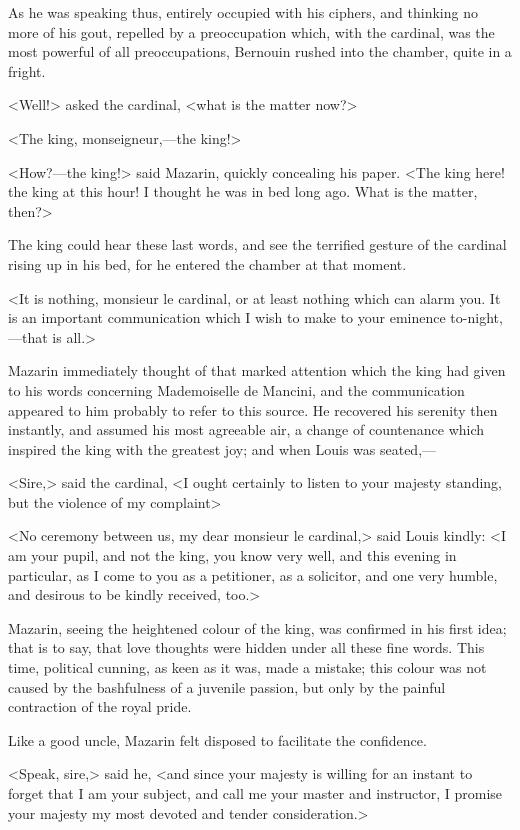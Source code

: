 As he was speaking thus, entirely occupied with his ciphers, and thinking no more of his gout, repelled by a preoccupation which, with the cardinal, was the most powerful of all preoccupations, Bernouin rushed into the chamber, quite in a fright.

<Well!> asked the cardinal, <what is the matter now?>

<The king, monseigneur,—the king!>

<How?—the king!> said Mazarin, quickly concealing his paper. <The king here! the king at this hour! I thought he was in bed long ago. What is the matter, then?>

The king could hear these last words, and see the terrified gesture of the cardinal rising up in his bed, for he entered the chamber at that moment.

<It is nothing, monsieur le cardinal, or at least nothing which can alarm you. It is an important communication which I wish to make to your eminence to-night,—that is all.>

Mazarin immediately thought of that marked attention which the king had given to his words concerning Mademoiselle de Mancini, and the communication appeared to him probably to refer to this source. He recovered his serenity then instantly, and assumed his most agreeable air, a change of countenance which inspired the king with the greatest joy; and when Louis was seated,—

<Sire,> said the cardinal, <I ought certainly to listen to your majesty standing, but the violence of my complaint\longdash>

<No ceremony between us, my dear monsieur le cardinal,> said Louis kindly: <I am your pupil, and not the king, you know very well, and this evening in particular, as I come to you as a petitioner, as a solicitor, and one very humble, and desirous to be kindly received, too.>

Mazarin, seeing the heightened colour of the king, was confirmed in his first idea; that is to say, that love thoughts were hidden under all these fine words. This time, political cunning, as keen as it was, made a mistake; this colour was not caused by the bashfulness of a juvenile passion, but only by the painful contraction of the royal pride.

Like a good uncle, Mazarin felt disposed to facilitate the confidence.

<Speak, sire,> said he, <and since your majesty is willing for an instant to forget that I am your subject, and call me your master and instructor, I promise your majesty my most devoted and tender consideration.>

